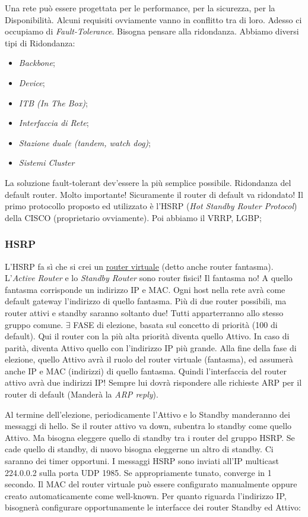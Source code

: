 Una rete può essere progettata per le performance, per la sicurezza, per la Disponibilità. Alcuni requisiti ovviamente vanno in conflitto tra di loro. Adesso ci occupiamo di \textit{Fault-Tolerance}. Bisogna pensare alla ridondanza. Abbiamo diversi tipi di Ridondanza:

\begin{itemize}
\item{\textit{Backbone}};
\item{\textit{Device}};
\item{\textit{ITB (In The Box)}};
\item{\textit{Interfaccia di Rete}};
\item{\textit{Stazione duale (tandem, watch dog)}};
\item{\textit{Sistemi Cluster}}
\end{itemize}

La soluzione fault-tolerant dev'essere la più semplice possibile. Ridondanza del default router. Molto importante! Sicuramente il router di default va ridondato! Il primo protocollo proposto ed utilizzato è l'HSRP (\textit{Hot Standby Router Protocol}) della CISCO (proprietario ovviamente). Poi abbiamo il VRRP, LGBP;

\subsubsection{HSRP}

L'HSRP fa sì che si crei un \underline{router virtuale} (detto anche router fantasma). L'\textit{Active Router} e lo \textit{Standby Router} sono router fisici! Il fantasma no! A quello fantasma corrisponde un indirizzo IP e MAC. Ogni host nella rete avrà come default gateway l'indirizzo di quello fantasma. Più di due router possibili, ma router attivi e standby saranno soltanto due! Tutti apparterranno allo stesso gruppo comune. $\exists$ FASE di elezione, basata sul concetto di priorità (100 di default). Qui il router con la più alta priorità diventa quello Attivo. In caso di parità, diventa Attivo quello con l'indirizzo IP più grande. Alla fine della fase di elezione, quello Attivo avrà il ruolo del router virtuale (fantasma), ed assumerà anche IP e MAC (indirizzi) di quello fantasma. Quindi l'interfaccia del router attivo avrà due indirizzi IP! Sempre lui dovrà rispondere alle richieste ARP per il router di default (Manderà la \textit{ARP reply}).

Al termine dell'elezione, periodicamente l'Attivo e lo Standby manderanno dei messaggi di hello. Se il router attivo va down, subentra lo standby come quello Attivo. Ma bisogna eleggere quello di standby tra i router del gruppo HSRP. Se cade quello di standby, di nuovo bisogna eleggerne un altro di standby. Ci saranno dei timer opportuni. I messaggi HSRP sono inviati all'IP multicast 224.0.0.2 sulla porta UDP 1985. Se appropriamente tunato, converge in 1 secondo. Il MAC del router virtuale può essere configurato manualmente oppure creato automaticamente come well-known. Per quanto riguarda l'indirizzo IP, bisognerà configurare opportunamente le interfacce dei router Standby ed Attivo:

